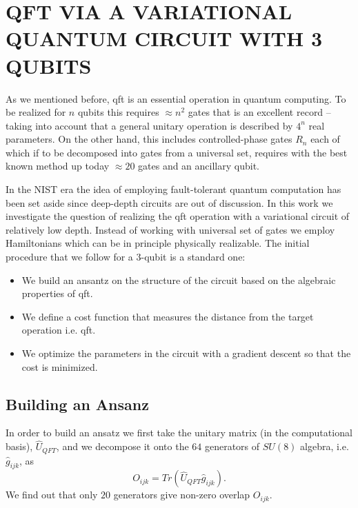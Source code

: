 \documentclass[inscr,ack,preface]{diphdthesis}
\begin{document}
\chapter{QFT VIA A VARIATIONAL QUANTUM CIRCUIT WITH 3 QUBITS}

\label{chap:qft_vqc}

As we mentioned before, \acrshort{qft} is an essential operation in quantum computing. To be realized for $n$ \acrshort{qubit}s this requires 
$\approx n^2$ gates that is an excellent record --taking into account that a general unitary operation
is described by $4^n$ real parameters. On the other hand, this includes controlled-phase gates $R_n$
each of which if to be decomposed into gates from a universal set, requires with the best known
method up today $\approx 20$ gates and an ancillary \acrshort{qubit}. 

In the NIST era the idea of employing fault-tolerant quantum computation has been set aside
since deep-depth circuits are out of discussion. In this work we investigate the question
of realizing the \acrshort{qft} operation with a variational circuit of relatively low depth. Instead of
working with universal set of gates we employ Hamiltonians which can be in principle physically realizable.
 The initial procedure that we follow for a $3$-\acrshort{qubit} is a standard one:
\begin{itemize}
	\item We build an ansantz on the structure of the circuit based on the algebraic properties of \acrshort{qft}.
	\item We define a cost function that measures the distance from the target operation i.e. \acrshort{qft}.
	\item We optimize the parameters in the circuit with a  gradient descent so that the cost is minimized. 
\end{itemize}

  
\section{Building an Ansanz} 

In order to build an ansatz we first take the unitary matrix (in the computational basis), $\hat{U}_{QFT}$,
and we decompose it onto the $64$ generators of $SU(8)$ algebra, i.e. $\hat{g}_{ijk}$,
as 
\begin{equation}
O_{ijk}=Tr\left(\hat{U}_{QFT} \hat{g}_{ijk} \right).
\end{equation}
We find out that only $20$ generators give non-zero overlap $O_{ijk}$.
\end{document}
